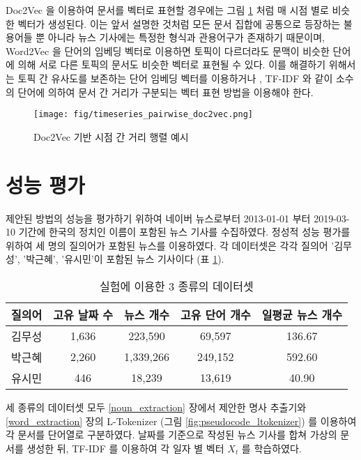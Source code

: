 \documentclass[oneside, ko,phd]{snuthesis_utf8_kor}
\begin{document}
Doc2Vec 을 이용하여 문서를 벡터로 표현할 경우에는 그림 \ref{fig:timeseries_pairwise_doc2vec} 처럼 매 시점 별로 비슷한 벡터가 생성된다.
이는 앞서 설명한 것처럼 모든 문서 집합에 공통으로 등장하는 불용어들 뿐 아니라 뉴스 기사에는 특정한 형식과 관용어구가 존재하기 때문이며, Word2Vec 을 단어의 임베딩 벡터로 이용하면 토픽이 다르더라도 문맥이 비슷한 단어에 의해 서로 다른 토픽의 문서도 비슷한 벡터로 표현될 수 있다.
이를 해결하기 위해서는 토픽 간 유사도를 보존하는 단어 임베딩 벡터를 이용하거나 \cite{moody2016mixing, liu2015topical}, TF-IDF 와 같이 소수의 단어에 의하여 문서 간 거리가 구분되는 벡터 표현 방법을 이용해야 한다.

\begin{figure}[H]
\centering
\texttt{[image: fig/timeseries\_pairwise\_doc2vec.png]}
\caption{Doc2Vec 기반 시점 간 거리 행렬 예시}
\label{fig:timeseries_pairwise_doc2vec}
\end{figure}

\section{성능 평가}

제안된 방법의 성능을 평가하기 위하여 네이버 뉴스로부터 2013-01-01 부터 2019-03-10 기간에 한국의 정치인 이름이 포함된 뉴스 기사를 수집하였다.
정성적 성능 평가를 위하여 세 명의 질의어가 포함된 뉴스를 이용하였다.
각 데이터셋은 각각 질의어 '김무성', '박근혜', '유시민'이 포함된 뉴스 기사이다 (표 \ref{tab:timeseries_dataset}).

\begin{table}[H]
\centering
\caption{실험에 이용한 3 종류의 데이터셋}
\label{tab:timeseries_dataset}
\begin{tabular}{|c|c|c|c|c|}
\hline
질의어 & 고유 날짜 수 & 뉴스 개수 & 고유 단어 개수 & 일평균 뉴스 개수 \\ \hline
김무성 & 1,636 & 223,590 & 69,597 & 136.67 \\ \hline
박근혜 & 2,260 & 1,339,266 & 249,152 & 592.60 \\ \hline
유시민 & 446 & 18,239 & 13,619 & 40.90 \\ \hline
\end{tabular}
\end{table}

세 종류의 데이터셋 모두 \ref{noun_extraction} 장에서 제안한 명사 추출기와 \ref{word_extraction} 장의 L-Tokenizer (그림 \ref{fig:pseudocode_ltokenizer}) 를 이용하여 각 문서를 단어열로 구분하였다.
날짜를 기준으로 작성된 뉴스 기사를 합쳐 가상의 문서를 생성한 뒤, TF-IDF 를 이용하여 각 일자 별 벡터 $X_t$ 를 학습하였다.
\end{document}
